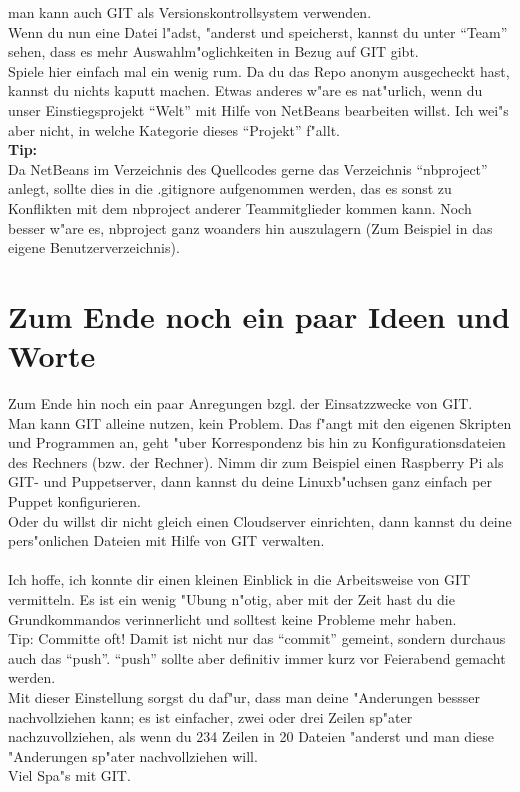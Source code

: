 \documentclass[german,a4paper]{report}
\begin{document}
man kann auch GIT als Versionskontrollsystem verwenden.\\
Wenn du nun eine Datei l"adst, "anderst und speicherst, kannst du
unter ``Team'' sehen, dass es mehr Auswahlm"oglichkeiten in Bezug
auf GIT gibt.\\
Spiele hier einfach mal ein wenig rum. Da du das Repo anonym
ausgecheckt hast, kannst du nichts kaputt machen. Etwas anderes
w"are es nat"urlich, wenn du unser Einstiegsprojekt ``Welt'' mit
Hilfe von NetBeans bearbeiten willst. Ich wei"s aber nicht, in
welche Kategorie dieses ``Projekt'' f"allt.
\\
\textbf{Tip:}\\
Da NetBeans im Verzeichnis des Quellcodes gerne das Verzeichnis ``nbproject''
anlegt, sollte dies in die .gitignore aufgenommen werden, das es sonst
zu Konflikten mit dem nbproject anderer Teammitglieder kommen kann.
Noch besser w"are es, nbproject ganz woanders hin auszulagern (Zum
Beispiel in das eigene Benutzerverzeichnis).

\chapter{Zum Ende noch ein paar Ideen und Worte}
Zum Ende hin noch ein paar Anregungen bzgl. der Einsatzzwecke
von GIT.\\
Man kann GIT alleine nutzen, kein Problem. Das f"angt mit den
eigenen Skripten und Programmen an, geht "uber Korrespondenz
bis hin zu Konfigurationsdateien des Rechners (bzw. der Rechner).
Nimm dir zum Beispiel einen Raspberry Pi als GIT- und Puppetserver,
dann kannst du deine Linuxb"uchsen ganz einfach per Puppet
konfigurieren.\\
Oder du willst dir nicht gleich einen Cloudserver einrichten, dann
kannst du deine pers"onlichen Dateien mit Hilfe von GIT verwalten.\\
\\
Ich hoffe, ich konnte dir einen kleinen Einblick in die Arbeitsweise
von GIT vermitteln. Es ist ein wenig "Ubung n"otig, aber mit der Zeit
hast du die Grundkommandos verinnerlicht und solltest keine Probleme
mehr haben.\\
Tip: Committe oft! Damit ist nicht nur das ``commit'' gemeint, sondern
durchaus auch das ``push''. ``push'' sollte aber definitiv immer kurz
vor Feierabend gemacht werden.\\
Mit dieser Einstellung sorgst du daf"ur, dass man deine "Anderungen
bessser nachvollziehen kann; es ist einfacher, zwei oder drei Zeilen
sp"ater nachzuvollziehen, als wenn du 234 Zeilen in 20 Dateien
"anderst und man diese "Anderungen sp"ater nachvollziehen will.
\\
Viel Spa"s mit GIT.
\end{document}
